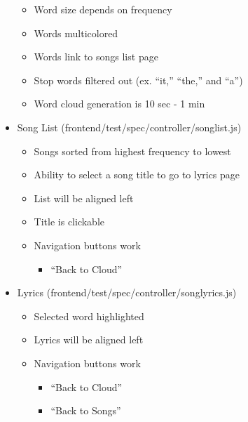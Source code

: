 \documentclass[]{article}
\begin{document}
\begin{itemize}
  \begin{itemize}
  \itemsep1pt\parskip0pt
  \item
    Word size depends on frequency
  \item
    Words multicolored
  \item
    Words link to songs list page
  \item
    Stop words filtered out (ex. ``it,'' ``the,'' and ``a'')
  \item
    Word cloud generation is 10 sec - 1 min
  \end{itemize}
\item
  Song List (frontend/test/spec/controller/songlist.js)

  \begin{itemize}
  \itemsep1pt\parskip0pt
  \item
    Songs sorted from highest frequency to lowest
  \item
    Ability to select a song title to go to lyrics page
  \item
    List will be aligned left
  \item
    Title is clickable
  \item
    Navigation buttons work

    \begin{itemize}
    \itemsep1pt\parskip0pt
    \item
      ``Back to Cloud''
    \end{itemize}
  \end{itemize}
\item
  Lyrics (frontend/test/spec/controller/songlyrics.js)

  \begin{itemize}
  \itemsep1pt\parskip0pt
  \item
    Selected word highlighted
  \item
    Lyrics will be aligned left
  \item
    Navigation buttons work

    \begin{itemize}
    \itemsep1pt\parskip0pt
    \item
      ``Back to Cloud''
    \item
      ``Back to Songs''
    \end{itemize}
  \end{itemize}
\end{itemize}
\end{document}
